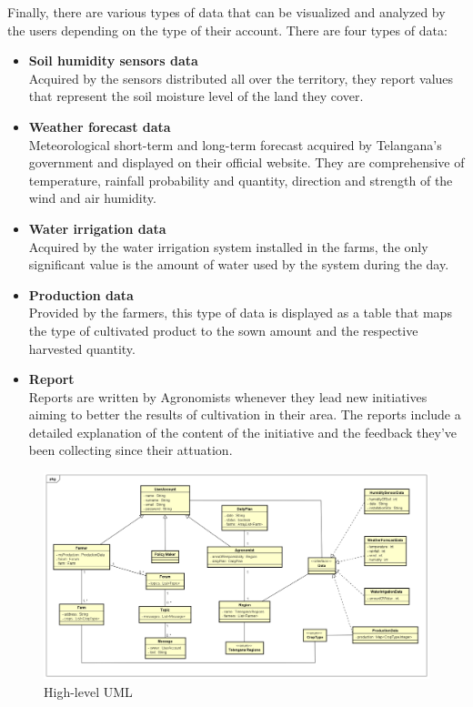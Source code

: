 \documentclass[table, 12pt]{article}
\begin{document}
Finally, there are various types of data that can be visualized and analyzed by the users
depending on the type of their account.
There are four types of data:
\begin{itemize}
    \item \textbf{Soil humidity sensors data}\\
    Acquired by the sensors distributed all over the territory, they report values that represent the soil moisture level of the land they cover.
    \item \textbf{Weather forecast data}\\
    Meteorological short-term and long-term forecast acquired by Telangana's government and displayed on their official website. They are comprehensive of temperature, rainfall probability and quantity, direction and strength of the wind and air humidity.
    \item \textbf{Water irrigation data}\\
    Acquired by the water irrigation system installed in the farms, the only significant value is the amount of water used by the system during the day.
    \item \textbf{Production data}\\
    Provided by the farmers, this type of data is displayed as a table that maps the type of cultivated product to the sown amount and the respective harvested quantity.
    \item \textbf{Report}\\
    Reports are written by Agronomists whenever they lead new initiatives aiming to better the results of cultivation in their area. The reports include a detailed explanation of the content of the initiative and the feedback they've been collecting since their attuation.
\end{itemize}
\begin{center}
    \begin{figure}[H]
        \includegraphics[scale=0.45, center]{assets/UML/UML.png}
        \caption{High-level UML}
        \label{fig: UML}
    \end{figure}
\end{center}
\end{document}
